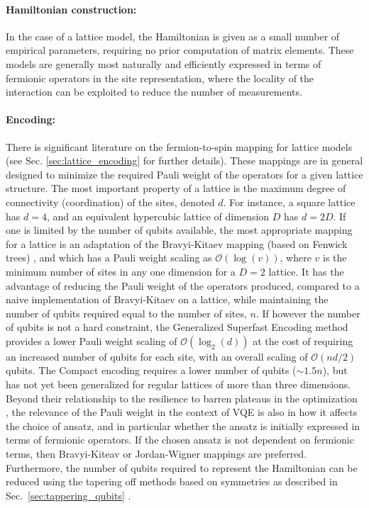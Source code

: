 \paragraph{Hamiltonian construction:} In the case of a lattice model, the Hamiltonian is given as a small number of empirical parameters, requiring no prior computation of matrix elements. These models are generally most naturally and efficiently expressed in terms of fermionic operators in the site representation, where the locality of the interaction can be exploited to reduce the number of measurements. %

\paragraph{Encoding:} There is significant literature on the fermion-to-spin mapping for lattice models (see Sec. \ref{sec:lattice_encoding} for further details). These mappings are in general designed to minimize the required Pauli weight of the operators for a given lattice structure. The most important property of a lattice is the maximum degree of connectivity (coordination) of the sites, denoted $d$. For instance, a square lattice has $d=4$, and an equivalent hypercubic lattice of dimension $D$ has $d=2D$. 
If one is limited by the number of qubits available, the most appropriate mapping for a lattice is an adaptation of the Bravyi-Kitaev mapping (based on Fenwick trees) \cite{Havlek2017}, and which has a Pauli weight scaling as $\mathcal{O}(\log(v))$, where $v$ is the minimum number of sites in any one dimension for a $D=2$ lattice. It has the advantage of reducing the Pauli weight of the operators produced, compared to a naive implementation of Bravyi-Kitaev on a lattice, while maintaining the number of qubits required equal to the number of sites, $n$. If however the number of qubits is not a hard constraint, the Generalized Superfast Encoding method \cite{Setia2019} provides a lower Pauli weight scaling of $\mathcal{O}(\log_2(d))$ at the cost of requiring an increased number of qubits for each site, with an overall scaling of $\mathcal{O}(nd/2)$ qubits. The Compact encoding \cite{Derby2021, Derby2021_part2} requires a lower number of qubits ($\sim 1.5n$), but has not yet been generalized for regular lattices of more than three dimensions.  
Beyond their relationship to the resilience to barren plateaus in the optimization \cite{Cerezo2021_BP, Uvarov2020, Uvarov2020_frustrated}, the relevance of the Pauli weight in the context of VQE is also in how it affects the choice of ansatz, and in particular whether the ansatz is initially expressed in terms of fermionic operators. If the chosen ansatz is not dependent on fermionic terms, then Bravyi-Kiteav or Jordan-Wigner mappings are preferred. Furthermore, the number of qubits required to represent the Hamiltonian can be reduced using the tapering off methods based on symmetries as described in Sec.~\ref{sec:tappering_qubits} \cite{bravyi_tapering_2017, Setia2020}. 

